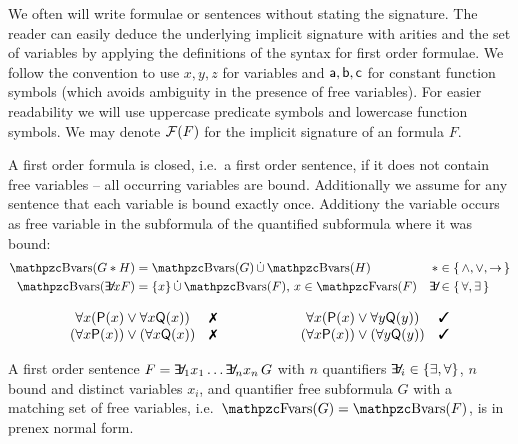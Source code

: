 We often will write formulae or sentences
without stating the signature.
The reader can easily deduce the underlying {\myem implicit} signature with arities
and the set of variables by applying the definitions of the syntax for first order formulae.
We follow the convention to use $x,y,z$ for variables
and $\mathsf{a},\mathsf{b},\mathsf{c}$ for constant function symbols
(which avoids ambiguity in the presence of free variables).
For easier readability we will use uppercase predicate symbols and lowercase function symbols.
We may denote $\mathcal{F}(F)$ for the implicit signature of an formula $F$.

\begin{definition}\label{def:fof:closed}\label{def:fof:sentence}
	A first order formula is closed, i.e.~a first order {\myem sentence},
	if it does not contain free variables -- all occurring variables are bound.
	Additionally we assume for any sentence
	that each variable is bound exactly once.
	Additiony the variable occurs as free variable
	in the subformula of the quantified subformula
	where it was bound:
	\begin{align*}
	\bvar(G * H) &= \bvar(G)\disjointunion\bvar(H)
	 &*& \in\{\,\land,\lor,\limp\,\}
	\\
	\bvar(\quantify x F) &= \{x\}\disjointunion\bvar(F)\text{, } x\in\fvar(F)
	&\quantify& \in\{\, \forall, \exists\,\}
\end{align*}
\end{definition}

\begin{example}
	\[
	\begin{array}{clccl}
		\forall x ({\mP(x) \lor \forall x {\mQ(x)}}) &
		\text{\xmark}
		&\qquad\qquad
		&
		\forall x ({\mP(x) \lor \forall y {\mQ(y)}}) &
		\text{\cmark}
		\\
		(\forall x {\mP(x)}) \lor (\forall x {\mQ(x)}) &
		\text{\xmark}
		&&
		(\forall x {\mP(x)}) \lor (\forall y {\mQ(y)}) &
		\text{\cmark}
	\end{array}
	\]

\end{example}

\begin{definition}[\PNF]
	A first order sentence $F = \quantify_1 x_1 \ldots \quantify_n x_n\, G$
	with $n$ quantifiers $\quantify_i \in \{\exists,\forall\}$,
	$n$ bound and distinct variables $x_i$,
	and quantifier free subformula $G$ with
	a matching set of free variables, i.e.~$\fvar(G) = \bvar(F)$,
	is in {\myem prenex normal form}.
\end{definition}


